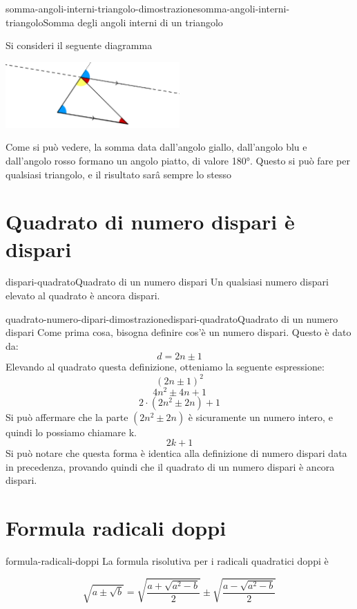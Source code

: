 \documentclass[preview]{standalone}
\begin{document}
\begin{snippetproof}{somma-angoli-interni-triangolo-dimostrazione}{somma-angoli-interni-triangolo}{Somma degli angoli interni di un triangolo}

  Si consideri il seguente diagramma

  \vspace{0.5cm}

  \begin{center}
      \includegraphics[width=0.5\textwidth]{resources/internal-angles-triangle.png}
  \end{center}

  \vspace{0.5cm}

  Come si può vedere, la somma data dall'angolo giallo, dall'angolo blu e dall'angolo rosso formano
  un angolo piatto, di valore 180°. Questo si può fare per qualsiasi triangolo, e il risultato sarâ
  sempre lo stesso

\end{snippetproof}

\section{Quadrato di numero dispari è dispari}

\begin{snippettheorem}{dispari-quadrato}{Quadrato di un numero dispari}
  Un qualsiasi numero dispari elevato al quadrato è ancora dispari.
\end{snippettheorem}

\begin{snippetproof}{quadrato-numero-dipari-dimostrazione}{dispari-quadrato}{Quadrato di un numero dispari}
  Come prima cosa, bisogna definire cos'è un numero dispari. Questo è dato da:
  \[
    d = 2n \pm 1 
  \]
  Elevando al quadrato questa definizione, otteniamo la seguente espressione:
  \[
    (2n \pm 1)^2
  \]
  \[ 
    4n^2 \pm 4n + 1
  \]
  \[ 
    2 \cdot (2n^2 \pm 2n) + 1
  \]
  Si può affermare che la parte \((2n^2 \pm 2n) \) è sicuramente un numero intero, e quindi lo possiamo chiamare k. 
  \[ 
    2k + 1
  \]
  Si può notare che questa forma è identica alla definizione di numero dispari data in precedenza, provando
  quindi che il quadrato di un numero dispari è ancora dispari.
\end{snippetproof}

\section{Formula radicali doppi}

\begin{snippet}{formula-radicali-doppi}
  La formula risolutiva per i radicali quadratici doppi è

  \[ 
    \sqrt{a \pm \sqrt{b}} = \sqrt{\frac{a + \sqrt{a^2 - b}}{2}} \pm \sqrt{\frac{a - \sqrt{a^2 - b}}{2}}
  \]
\end{snippet}
\end{document}
